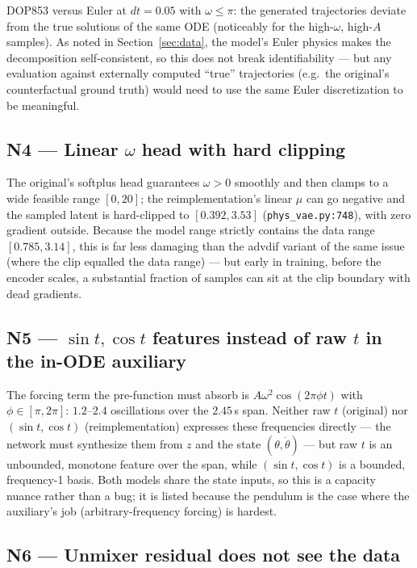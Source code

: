 \documentclass[11pt,a4paper]{article}
\newcommand{\code}[1]{\texttt{#1}}
\begin{document}
DOP853 versus Euler at $dt = 0.05$ with $\omega \le \pi$: the generated
trajectories deviate from the true solutions of the same ODE (noticeably for
the high-$\omega$, high-$A$ samples). As noted in Section~\ref{sec:data}, the
model's Euler physics makes the decomposition self-consistent, so this does not
break identifiability --- but any evaluation against externally computed
``true'' trajectories (e.g.\ the original's counterfactual ground truth) would
need to use the same Euler discretization to be meaningful.

\subsection*{N4 --- Linear $\omega$ head with hard clipping}

The original's softplus head guarantees $\omega > 0$ smoothly and then clamps
to a wide feasible range $[0, 20]$; the reimplementation's linear $\mu$ can go
negative and the sampled latent is hard-clipped to $[0.392, 3.53]$
(\code{phys\_vae.py:748}), with zero gradient outside. Because the model range
strictly contains the data range $[0.785, 3.14]$, this is far less damaging
than the advdif variant of the same issue (where the clip equalled the data
range) --- but early in training, before the encoder scales, a substantial
fraction of samples can sit at the clip boundary with dead gradients.

\subsection*{N5 --- $\sin t, \cos t$ features instead of raw $t$ in the in-ODE auxiliary}

The forcing term the pre-function must absorb is
$A\omega^2\cos(2\pi\phi t)$ with $\phi \in [\pi, 2\pi]$: $1.2$--$2.4$
oscillations over the $2.45$\,s span. Neither raw $t$ (original) nor
$(\sin t, \cos t)$ (reimplementation) expresses these frequencies directly ---
the network must synthesize them from $z$ and the state $(\theta, \dot\theta)$
--- but raw $t$ is an unbounded, monotone feature over the span, while
$(\sin t, \cos t)$ is a bounded, frequency-1 basis. Both models share the
state inputs, so this is a capacity nuance rather than a bug; it is listed
because the pendulum is the case where the auxiliary's job (arbitrary-frequency
forcing) is hardest.

\subsection*{N6 --- Unmixer residual does not see the data}
\end{document}

